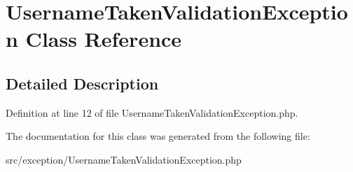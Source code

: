\hypertarget{classcommon_1_1user_1_1exception_1_1_username_taken_validation_exception}{\section{\-Username\-Taken\-Validation\-Exception \-Class \-Reference}
\label{classcommon_1_1user_1_1exception_1_1_username_taken_validation_exception}
}


\subsection{\-Detailed \-Description}


\-Definition at line 12 of file \-Username\-Taken\-Validation\-Exception.\-php.



\-The documentation for this class was generated from the following file\-:\begin{DoxyCompactItemize}
\item 
src/exception/\-Username\-Taken\-Validation\-Exception.\-php\end{DoxyCompactItemize}
